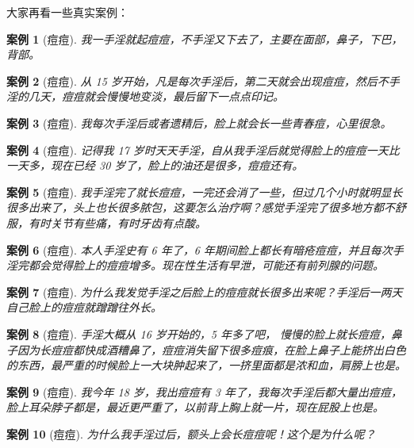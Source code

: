 \documentclass{ctexart}
\newtheorem{case}{案例}
\begin{document}
大家再看一些真实案例：

\begin{case}[痘痘]\it
    我一手淫就起痘痘，不手淫又下去了，主要在面部，鼻子，下巴，背部。
\end{case}

\begin{case}[痘痘]\it
    从 15 岁开始，凡是每次手淫后，第二天就会出现痘痘，然后不手淫的几天，痘痘就会慢慢地变淡，最后留下一点点印记。
\end{case}

\begin{case}[痘痘]\it\label{DoudouCaseRef1}
    我每次手淫后或者遗精后，脸上就会长一些青春痘，心里很急。
\end{case}

\begin{case}[痘痘]\it
    记得我 17 岁时天天手淫，自从我手淫后就觉得脸上的痘痘一天比一天多，现在已经 30 岁了，脸上的油还是很多，痘痘还有。
\end{case}

\begin{case}[痘痘]\it\label{DoudouCaseRef2}
    我手淫完了就长痘痘，一完还会消了一些，但过几个小时就明显长很多出来了，头上也长很多脓包，这要怎么治疗啊？感觉手淫完了很多地方都不舒服，有时关节有些痛，有时牙齿有点酸。
\end{case}

\begin{case}[痘痘]\it
    本人手淫史有 6 年了，6 年期间脸上都长有暗疮痘痘，并且每次手淫完都会觉得脸上的痘痘增多。现在性生活有早泄，可能还有前列腺的问题。
\end{case}

\begin{case}[痘痘]\it
    为什么我发觉手淫之后脸上的痘痘就长很多出来呢？手淫后一两天自己脸上的痘痘就蹭蹭往外长。
\end{case}

\begin{case}[痘痘]\it
    手淫大概从 16 岁开始的，5 年多了吧， 慢慢的脸上就长痘痘，鼻子因为长痘痘都快成酒糟鼻了，痘痘消失留下很多痘痕，在脸上鼻子上能挤出白色的东西，最严重的时候脸上一大块肿起来了，一挤里面都是浓和血，肩膀上也是。
\end{case}

\begin{case}[痘痘]\it
    我今年 18 岁，我出痘痘有 3 年了，我每次手淫后都大量出痘痘，脸上耳朵脖子都是，最近更严重了，以前背上胸上就一片，现在屁股上也是。
\end{case}

\begin{case}[痘痘]\it
    为什么我手淫过后，额头上会长痘痘呢！这个是为什么呢？
\end{case}
\end{document}
